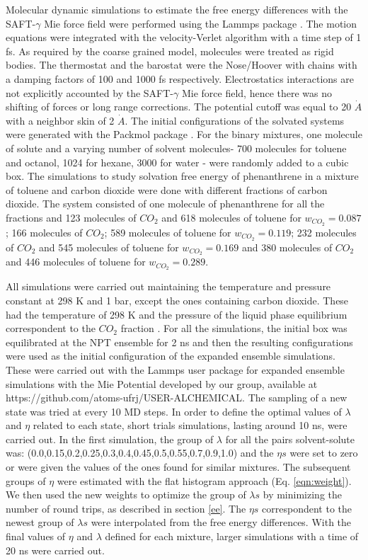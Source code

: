Molecular dynamic simulations to estimate the free energy differences with the SAFT-$\gamma$ Mie force field were performed using the Lammps package \cite{lammps}. The motion equations were integrated with the velocity-Verlet algorithm \cite{verlet} with a time step of 1 fs. As required by the coarse grained model,  molecules were treated as rigid bodies. The thermostat and the barostat were the Nose/Hoover with chains with a damping factors of 100 and 1000 fs respectively. Electrostatics interactions are not explicitly accounted by the SAFT-$\gamma$ Mie force field, hence there was no shifting of forces or long range corrections. The potential cutoff was equal to 20 $\dot{A}$ \cite{muller2017} with a neighbor skin of 2 $\dot{A}$. The initial configurations of the  solvated systems were generated with the Packmol package \cite{packmol}. For the binary mixtures, one molecule of solute and a varying number of solvent molecules- 700 molecules for toluene and octanol, 1024 for hexane, 3000 for water - were randomly added to a cubic box. The simulations to study solvation free energy of phenanthrene in a mixture of toluene and carbon dioxide were done with different fractions of carbon dioxide. The  system consisted of one molecule of phenanthrene for all the fractions and 123 molecules of $CO_{2}$ and 618 molecules of toluene for $w_{CO_{2}} = 0.087$; 166 molecules of $CO_{2}$; 589 molecules of toluene for $w_{CO_{2}} = 0.119$; 232 molecules of $CO_{2}$ and 545 molecules of toluene for $w_{CO_{2}} = 0.169$ and 380 molecules of $CO_{2}$ and 446 molecules of toluene for $w_{CO_{2}} = 0.289$.

All simulations were carried out maintaining the temperature and pressure constant at 298 K and 1 bar, except the ones containing carbon dioxide. These had the temperature of 298 K and the pressure of the liquid phase equilibrium correspondent to the $CO_{2}$ fraction \cite{co2toliq}. For all the simulations, the initial box was equilibrated at the NPT ensemble for 2 ns and then the resulting configurations were used as the initial configuration of the expanded ensemble simulations. These were carried out with the Lammps user package for expanded ensemble simulations with the Mie Potential developed by our group, available at https://github.com/atoms-ufrj/USER-ALCHEMICAL. The sampling of a new state was tried at every 10 MD steps. In order to define the optimal values of $\lambda$ and $\eta$ related to each state, short trials simulations, lasting around 10 ns, were carried out. In the first simulation, the group of $\lambda$ for all the pairs solvent-solute was: (0.0,0.15,0.2,0.25,0.3,0.4,0.45,0.5,0.55,0.7,0.9,1.0) and the $\eta s$ were set to zero or were given the values of the ones found for similar mixtures. The subsequent groups of $\eta$ were estimated  with the flat histogram approach (Eq. \eqref{eqn:weight}). We then used the new weights to optimize the group of $\lambda s$ by minimizing the number of round trips, as described in section \ref{ee}. The $\eta s$ correspondent to the newest group of $\lambda s$ were interpolated from the free energy differences. With the final values of $\eta$ and $\lambda $ defined for each mixture, larger simulations with a time of 20 ns were carried out. 

